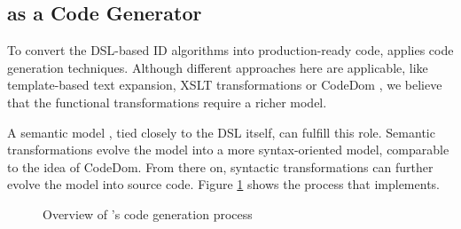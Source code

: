 \documentclass[conference]{IEEEtran}
\begin{document}
\subsection{\NAME as a Code Generator}
\label{code-generator-design}

To convert the DSL-based ID algorithms into production-ready code, \NAME
applies code generation techniques. Although different approaches here are
applicable, like template-based text expansion, XSLT transformations or CodeDom
\cite{dollard2004code}, we believe that the functional transformations require
a richer model.

A semantic model \cite{fowler2010domain}, tied closely to the DSL itself, can
fulfill this role. Semantic transformations evolve the model into a more
syntax-oriented model, comparable to the idea of CodeDom. From there on,
syntactic transformations can further evolve the model into source code. Figure
\ref{fig:code-generation} shows the process that \NAME implements.

\begin{figure}[ht]
  \centering
\caption{Overview of \NAME's code generation process}
\label{fig:code-generation}
\end{figure}
\end{document}
